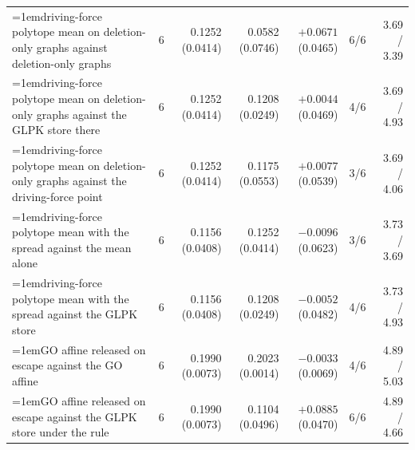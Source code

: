 \begin{table}[H]
\begin{tabular}{@{}>{\raggedright\hangindent=1em\hangafter=1\arraybackslash}p{78.5mm}rrrrrr@{}}
    driving-force polytope mean on deletion-only graphs against deletion-only graphs & 6 & 0.1252 (0.0414) & 0.0582 (0.0746) & $+0.0671$ (0.0465) & 6/6 & 3.69 / 3.39 \\
    driving-force polytope mean on deletion-only graphs against the GLPK store there & 6 & 0.1252 (0.0414) & 0.1208 (0.0249) & $+0.0044$ (0.0469) & 4/6 & 3.69 / 4.93 \\
    driving-force polytope mean on deletion-only graphs against the driving-force point & 6 & 0.1252 (0.0414) & 0.1175 (0.0553) & $+0.0077$ (0.0539) & 3/6 & 3.69 / 4.06 \\
    driving-force polytope mean with the spread against the mean alone & 6 & 0.1156 (0.0408) & 0.1252 (0.0414) & $-0.0096$ (0.0623) & 3/6 & 3.73 / 3.69 \\
    driving-force polytope mean with the spread against the GLPK store & 6 & 0.1156 (0.0408) & 0.1208 (0.0249) & $-0.0052$ (0.0482) & 4/6 & 3.73 / 4.93 \\
    GO affine released on escape against the GO affine & 6 & 0.1990 (0.0073) & 0.2023 (0.0014) & $-0.0033$ (0.0069) & 4/6 & 4.89 / 5.03 \\
    GO affine released on escape against the GLPK store under the rule & 6 & 0.1990 (0.0073) & 0.1104 (0.0496) & $+0.0885$ (0.0470) & 6/6 & 4.89 / 4.66 \\
    \hline
  \end{tabular}
\end{table}

